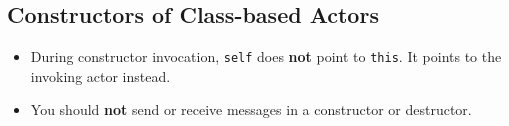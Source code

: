 \subsection{Constructors of Class-based Actors}

\begin{itemize}
\item During constructor invocation, \lstinline^self^ does \textbf{not} point to \lstinline^this^. It points to the invoking actor instead.
\item You should \textbf{not} send or receive messages in a constructor or destructor.
\end{itemize}
